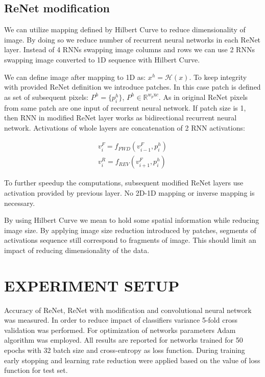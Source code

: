 \documentclass[a4paper, 10 pt, journal]{ieeeconf}
\begin{document}
\subsection{ReNet modification}

We can utilize mapping defined by Hilbert Curve to reduce dimensionality of image. By doing so we reduce number of recurrent neural networks in each ReNet layer. Instead of 4 RNNs swapping image columns and rows we can use 2 RNNs swapping image converted to 1D sequence with Hilbert Curve.

We can define image after mapping to 1D as: $x^{h} = \mathcal{H}(x)$. To keep integrity with provided ReNet definition we introduce patches. In this case patch is defined as set of subsequent pixels: $P^{h} = \{ p_{i}^h \}$, $P^{h} \in \mathbb{R}^{w_p \textrm{x} c}$. As in original ReNet pixels from same patch are one input of recurrent neural network. If patch size is 1, then RNN in modified ReNet layer works as bidirectional recurrent neural network. Activations of whole layers are concatenation of 2 RNN activations:

\begin{gather}
	v_{i}^{F} = f_{FWD}(v_{i-1}^{F}, p_{i}^{h}) \\
	v_{i}^{R} = f_{REV}(v_{i+1}^{F}, p_{i}^{h})
\end{gather}

To further speedup the computations, subsequent modified ReNet layers use activation provided by previous layer. No 2D-1D mapping or inverse mapping is necessary.

By using Hilbert Curve we mean to hold some spatial information while reducing image size. By applying image size reduction introduced by patches, segments of activations sequence still correspond to fragments of image. This should limit an impact of reducing dimensionality of the data.

\section{EXPERIMENT SETUP}

Accuracy of ReNet, ReNet with modification and convolutional neural network was measured. In order to reduce impact of classifiers variance 5-fold cross validation was performed. For optimization of networks parameters Adam algorithm was employed. All results are reported for networks trained for 50 epochs with 32 batch size and cross-entropy as loss function. During training early stopping and learning rate reduction were applied based on the value of loss function for test set.
\end{document}
